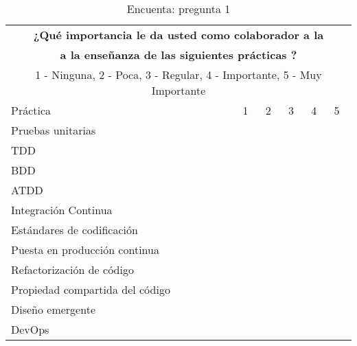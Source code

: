 \begin{table}[h!]
\begin{tabular}{ |p{7cm}||p{1cm}|p{1cm}|p{1cm}|p{1cm}|p{1cm}|  }
 \toprule[1.5pt]
 \multicolumn{6}{|c|}{\textbf{¿Qué importancia le da usted como colaborador a la }} \\
  \multicolumn{6}{|c|}{\textbf{a la enseñanza de las siguientes prácticas ?}} \\
  \multicolumn{6}{|c|}{1 - Ninguna, 2 - Poca, 3 - Regular, 4 - Importante, 5 - Muy Importante} \\
\toprule[1.5pt]
Práctica & 1 & 2 & 3 & 4 & 5 \\
\toprule[1.5pt]
    Pruebas unitarias & & & & &\\
    \hline
    TDD & & & & & \\
    \hline
    BDD & & & & & \\
    \hline
    ATDD & & & & & \\
    \hline
    Integración Continua & & & & & \\
    \hline
    Estándares de codificación & & & & & \\
    \hline
    Puesta en producción continua & & & & & \\
    \hline
    Refactorización de código & & & & & \\
    \hline
    Propiedad compartida del código & & & & & \\
    \hline
    Diseño emergente & & & & & \\
    \hline
    DevOps & & & & & \\
 \hline
\end{tabular}
    \caption{Encuenta: pregunta 1}
\end{table}


